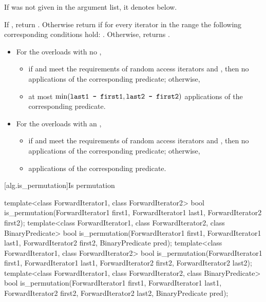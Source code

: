 \begin{itemdescr}
\pnum
\remarks If  was not given in the argument list, it denotes
 below.

\pnum
\returns
If
,
return
.
Otherwise return
if for every iterator
in the range 
the following corresponding conditions hold:
.
Otherwise, returns
.

\pnum
\complexity
\begin{itemize}
\item
For the overloads with no ,
\begin{itemize}
\item
if
and
meet the requirements of random access iterators
and
,
then
no applications of the corresponding predicate; otherwise,

\item
at most
$\min(\texttt{last1 - first1}, \texttt{last2 - first2})$
applications of the corresponding predicate.
\end{itemize}

\item
For the overloads with an ,
\begin{itemize}
\item
if
and
meet the requirements of random access iterators and
, then
no applications of the corresponding predicate; otherwise,

\item
{} applications
of the corresponding predicate.
\end{itemize}
\end{itemize}
\end{itemdescr}

[alg.is_permutation]{Is permutation}

%
\begin{itemdecl}
template<class ForwardIterator1, class ForwardIterator2>
  bool is_permutation(ForwardIterator1 first1, ForwardIterator1 last1,
                      ForwardIterator2 first2);
template<class ForwardIterator1, class ForwardIterator2,
                 class BinaryPredicate>
  bool is_permutation(ForwardIterator1 first1, ForwardIterator1 last1,
                      ForwardIterator2 first2, BinaryPredicate pred);
template<class ForwardIterator1, class ForwardIterator2>
  bool is_permutation(ForwardIterator1 first1, ForwardIterator1 last1,
                      ForwardIterator2 first2, ForwardIterator2 last2);
template<class ForwardIterator1, class ForwardIterator2,
                 class BinaryPredicate>
  bool is_permutation(ForwardIterator1 first1, ForwardIterator1 last1,
                      ForwardIterator2 first2, ForwardIterator2 last2,
                      BinaryPredicate pred);
\end{itemdecl}

